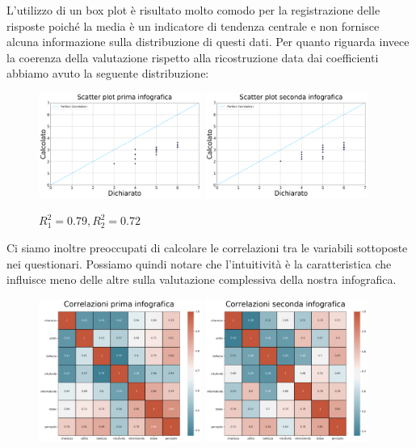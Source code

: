 \documentclass[10pt, a4paper,openany]{article}
\begin{document}
L'utilizzo di un box plot è risultato molto comodo per la registrazione delle risposte poiché la media è un indicatore di tendenza centrale e non fornisce alcuna informazione sulla distribuzione di questi dati.
Per quanto riguarda invece la coerenza della valutazione rispetto alla ricostruzione data dai coefficienti abbiamo avuto la seguente distribuzione:
\begin{figure}[H]
   \includegraphics[width=0.475\textwidth]{../quality/risposte_scatter_plot_first.png}
   \hfill
   \includegraphics[width=0.475\textwidth]{../quality/risposte_scatter_plot_second.png}
   \caption{$R_1^2 = 0.79, R_2^2 = 0.72$}
\end{figure}

Ci siamo inoltre preoccupati di calcolare le correlazioni tra le variabili sottoposte nei questionari. Possiamo quindi notare che l'intuitività è la caratteristica che influisce meno delle altre sulla valutazione complessiva della nostra infografica.
\begin{figure}[H]
   \includegraphics[width=0.475\textwidth]{../quality/risposte_correlation_plot_first.png}
   \hfill
   \includegraphics[width=0.475\textwidth]{../quality/risposte_correlation_plot_second.png}
\end{figure}
\end{document}
